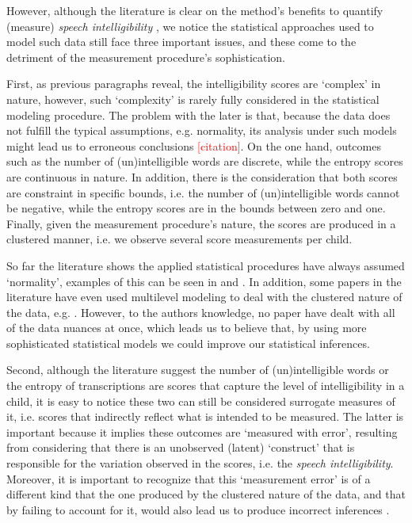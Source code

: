 However, although the literature is clear on the method's benefits to quantify (measure) \textit{speech intelligibility} \cite{Boonen_et_al_2020, Boonen_et_al_2021, Hustad_et_al_2020}, we notice the statistical approaches used to model such data still face three important issues, and these come to the detriment of the measurement procedure's sophistication. 

First, as previous paragraphs reveal, the intelligibility scores are `complex' in nature, however, such `complexity' is rarely fully considered in the statistical modeling procedure. The problem with the later is that, because the data does not fulfill the typical assumptions, e.g. normality, its analysis under such models might lead us to erroneous conclusions \textcolor{red}{[citation]}. On the one hand, outcomes such as the number of (un)intelligible words are discrete, while the entropy scores are continuous in nature. In addition, there is the consideration that both scores are constraint in specific bounds, i.e. the number of (un)intelligible words cannot be negative, while the entropy scores are in the bounds between zero and one. Finally, given the measurement procedure's nature, the scores are produced in a clustered manner, i.e. we observe several score measurements per child. 

So far the literature shows the applied statistical procedures have always assumed `normality', examples of this can be seen in \citet{Boonen_et_al_2021, Flipsen_et_al_2006} and \citet{Hustad_et_al_2020}. In addition, some papers in the literature have even used multilevel modeling to deal with the clustered nature of the data, e.g. \citet{Boonen_et_al_2021}. However, to the authors knowledge, no paper have dealt with all of the data nuances at once, which leads us to believe that, by using more sophisticated statistical models we could improve our statistical inferences. 

Second, although the literature suggest the number of (un)intelligible words or the entropy of transcriptions are scores that capture the level of intelligibility in a child, it is easy to notice these two can still be considered surrogate measures of it, i.e. scores that indirectly reflect what is intended to be measured. The latter is important because it implies these outcomes are `measured with error', resulting from considering that there is an unobserved (latent) `construct' that is responsible for the variation observed in the scores, i.e. the \textit{speech intelligibility}. Moreover, it is important to recognize that this `measurement error' is of a different kind that the one produced by the clustered nature of the data, and that by failing to account for it, would also lead us to produce incorrect inferences \cite{deHaan_et_al_2019}.

